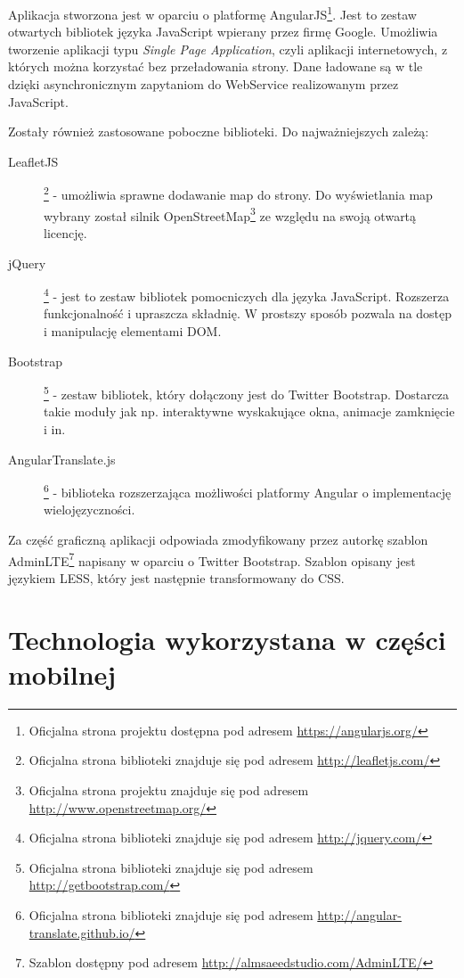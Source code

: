 \documentclass{book}
\begin{document}
		Aplikacja stworzona jest w oparciu o platformę AngularJS\footnote{Oficjalna strona projektu dostępna pod adresem \url{https://angularjs.org/}}. Jest to zestaw otwartych bibliotek języka JavaScript wpierany przez firmę Google. Umożliwia tworzenie aplikacji typu \emph{Single Page Application}, czyli aplikacji internetowych, z których można korzystać bez przeładowania strony. Dane ładowane są w tle dzięki asynchronicznym zapytaniom do WebService realizowanym przez JavaScript.
		
		Zostały również zastosowane poboczne biblioteki. Do najważniejszych zależą:
		
		\begin{description}
			
			\item[LeafletJS]\footnote{Oficjalna strona biblioteki znajduje się pod adresem \url{http://leafletjs.com/}} - 
			umożliwia sprawne dodawanie map do strony. Do wyświetlania map wybrany został silnik OpenStreetMap\footnote{Oficjalna strona projektu znajduje się pod adresem \url{http://www.openstreetmap.org/}} ze względu na swoją otwartą licencję.
			\item[jQuery]\footnote{Oficjalna strona biblioteki znajduje się pod adresem \url{http://jquery.com/}} - 
			jest to zestaw bibliotek pomocniczych dla języka JavaScript. Rozszerza funkcjonalność i upraszcza składnię. W prostszy sposób pozwala na dostęp i manipulację elementami DOM.
			\item[Bootstrap]\footnote{Oficjalna strona biblioteki znajduje się pod adresem \url{http://getbootstrap.com/}} - 
			zestaw bibliotek, który dołączony jest do Twitter Bootstrap. Dostarcza takie moduły jak np. interaktywne wyskakujące okna, animacje zamknięcie i in.
			\item[AngularTranslate.js]\footnote{Oficjalna strona biblioteki znajduje się pod adresem \url{http://angular-translate.github.io/}} - 
			biblioteka rozszerzająca możliwości platformy Angular o implementację wielojęzyczności.  
		
		\end{description}
				
		Za część graficzną aplikacji odpowiada zmodyfikowany przez autorkę szablon AdminLTE\footnote{Szablon dostępny pod adresem \url{http://almsaeedstudio.com/AdminLTE/}} napisany w oparciu o Twitter Bootstrap. Szablon opisany jest językiem LESS, który jest następnie transformowany do CSS.
		
		\section{Technologia wykorzystana w części mobilnej}
	
\end{document}
